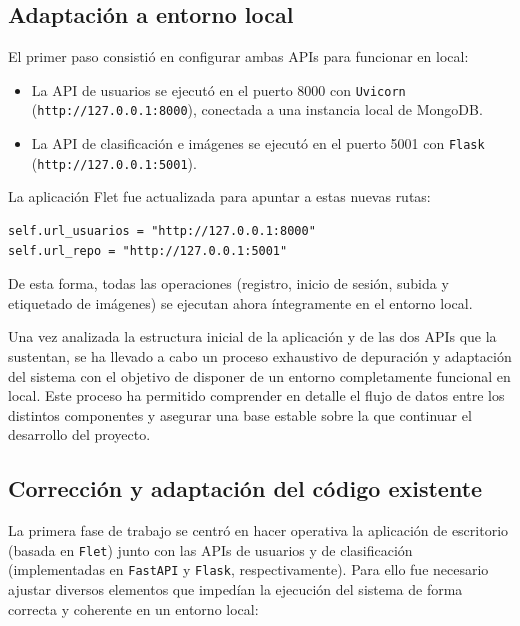\documentclass[12pt,a4paper]{article}
\begin{document}
\subsection{Adaptación a entorno local}

El primer paso consistió en configurar ambas APIs para funcionar en local:
\begin{itemize}
    \item La API de usuarios se ejecutó en el puerto 8000 con \texttt{Uvicorn} (\texttt{http://127.0.0.1:8000}), conectada a una instancia local de MongoDB.
    \item La API de clasificación e imágenes se ejecutó en el puerto 5001 con \texttt{Flask} (\texttt{http://127.0.0.1:5001}).
\end{itemize}

La aplicación Flet fue actualizada para apuntar a estas nuevas rutas:
\begin{verbatim}
self.url_usuarios = "http://127.0.0.1:8000"
self.url_repo = "http://127.0.0.1:5001"
\end{verbatim}

De esta forma, todas las operaciones (registro, inicio de sesión, subida y etiquetado de imágenes) se ejecutan ahora íntegramente en el entorno local.


Una vez analizada la estructura inicial de la aplicación y de las dos APIs que la sustentan, se ha llevado a cabo un proceso exhaustivo de depuración y adaptación del sistema con el objetivo de disponer de un entorno completamente funcional en local. Este proceso ha permitido comprender en detalle el flujo de datos entre los distintos componentes y asegurar una base estable sobre la que continuar el desarrollo del proyecto.

\subsection{Corrección y adaptación del código existente}

La primera fase de trabajo se centró en hacer operativa la aplicación de escritorio (basada en \texttt{Flet}) junto con las APIs de usuarios y de clasificación (implementadas en \texttt{FastAPI} y \texttt{Flask}, respectivamente). Para ello fue necesario ajustar diversos elementos que impedían la ejecución del sistema de forma correcta y coherente en un entorno local:
\end{document}
